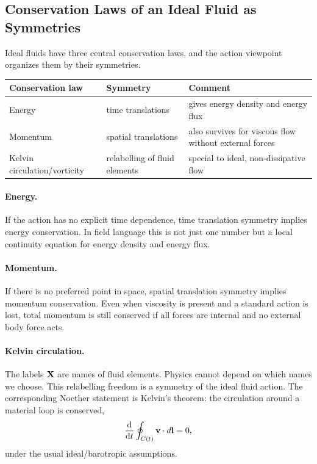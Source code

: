 \documentclass[../main.tex]{subfiles}
\begin{document}
\subsection{Conservation Laws of an Ideal Fluid as Symmetries}
Ideal fluids have three central conservation laws, and the action viewpoint
organizes them by their symmetries.

\begin{center}
\begin{tabular}{lll}
\toprule
Conservation law & Symmetry & Comment \\
\midrule
Energy & time translations & gives energy density and energy flux \\
Momentum & spatial translations & also survives for viscous flow without external forces \\
Kelvin circulation/vorticity & relabelling of fluid elements & special to ideal, non-dissipative flow \\
\bottomrule
\end{tabular}
\end{center}

\paragraph{Energy.}
If the action has no explicit time dependence, time translation symmetry implies
energy conservation.  In field language this is not just one number but a local
continuity equation for energy density and energy flux.

\paragraph{Momentum.}
If there is no preferred point in space, spatial translation symmetry implies
momentum conservation.  Even when viscosity is present and a standard action is
lost, total momentum is still conserved if all forces are internal and no
external body force acts.

\paragraph{Kelvin circulation.}
The labels $\mathbf{X}$ are names of fluid elements.  Physics cannot depend on
which names we choose.  This relabelling freedom is a symmetry of the ideal
fluid action.  The corresponding Noether statement is Kelvin's theorem: the
circulation around a material loop is conserved,
\begin{equation}
  \dv{}{t}\oint_{C(t)}\mathbf{v}\cdot d\mathbf{l}=0,
\end{equation}
under the usual ideal/barotropic assumptions.
\end{document}
